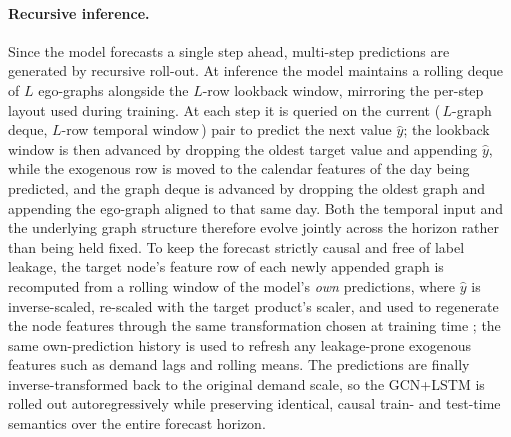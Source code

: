 \paragraph{Recursive inference.}
Since the model forecasts a single step ahead, multi-step predictions are
generated by recursive roll-out. At inference the model maintains a rolling
deque of $L$ ego-graphs alongside the $L$-row lookback window, mirroring the
per-step layout used during training. At each step it is queried on the current
(\,$L$-graph deque, $L$-row temporal window\,) pair to predict the next value
$\hat{y}$; the lookback window is then advanced by dropping the oldest target
value and appending $\hat{y}$, while the exogenous row is moved to the calendar
features of the day being predicted, and the graph deque is advanced by dropping
the oldest graph and appending the ego-graph aligned to that same day. Both the
temporal input and the underlying graph structure therefore evolve jointly
across the horizon rather than being held fixed. To keep the forecast strictly
causal and free of label leakage, the target node's feature row of each newly
appended graph is recomputed from a rolling window of the model's \emph{own}
predictions, where $\hat{y}$ is inverse-scaled, re-scaled with the target
product's scaler, and used to regenerate the node features through the same
transformation chosen at training time ; the same own-prediction history
is used to refresh any leakage-prone exogenous features such as demand lags and
rolling means. The predictions are finally inverse-transformed back to the
original demand scale, so the GCN+LSTM is rolled out autoregressively while
preserving identical, causal train- and test-time semantics over the entire
forecast horizon.

